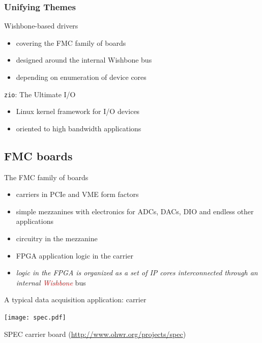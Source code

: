 \documentclass[compress,red]{beamer}
\begin{document}
\begin{frame}
\frametitle{Unifying Themes}
\begin{block}{Wishbone-based drivers}
\begin{itemize}
\item covering the FMC family of boards
\item designed around the internal Wishbone bus
\item depending on enumeration of device cores
\end{itemize}
\end{block}
\begin{block}{\texttt{zio}: The Ultimate I/O}
\begin{itemize}
\item Linux kernel framework for I/O devices
\item oriented to high bandwidth applications
\end{itemize}
\end{block}


\end{frame}

\subsection{FMC boards}
\begin{frame}{The FMC family of boards}
\begin{itemize}
\item carriers in PCIe and VME form factors
\item simple mezzanines with electronics for ADCs, DACs, DIO and endless
    other applications
\item circuitry in the mezzanine
\item FPGA application logic in the carrier
\item \emph{logic in the FPGA is organized as a set of IP cores
    interconnected through an internal \textcolor{red}{Wishbone}}
    bus
\end{itemize}
\end{frame}
\begin{frame}{A typical data acquisition application: carrier}
\begin{center}
\texttt{[image: spec.pdf]}
\end{center}
\centering
SPEC carrier board (\url{http://www.ohwr.org/projects/spec})
\end{frame}
\end{document}
